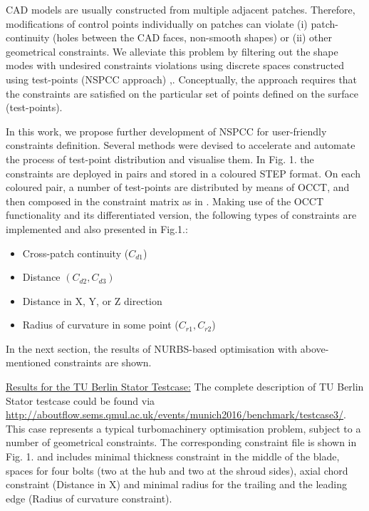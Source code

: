 \documentclass{article}
\begin{document}
CAD models are usually constructed from multiple adjacent patches. Therefore, modifications of control points individually on patches can violate (i) patch-continuity (holes between the CAD faces, non-smooth shapes) or (ii) other geometrical constraints. We alleviate this problem by filtering out the shape modes with undesired constraints violations using discrete spaces constructed using test-points (NSPCC approach) \cite{xu13:cad-based},\cite{xu15cad-based}. Conceptually, the approach requires that the constraints are satisfied on the particular set of points defined on the surface (test-points). 

In this work, we propose further development of NSPCC for user-friendly constraints definition. Several methods were devised to accelerate and automate the process of test-point distribution and visualise them.  In Fig. 1. the constraints are deployed in pairs and stored in a coloured STEP format. On each coloured pair, a number of test-points are distributed by means of OCCT, and then composed in the constraint matrix as in \cite{xu15cad-based}. Making use of the OCCT functionality and its differentiated version, the following types of constraints are implemented and also presented in Fig.1.:
\begin{itemize}
\item Cross-patch continuity ($C_{d1}$)
\item Distance $(C_{d2}, C_{d3})$
\item Distance in X, Y, or Z direction
\item Radius of curvature in some point ($C_{r1}, C_{r2}$)
\end{itemize}
In the next section, the results of NURBS-based optimisation with above-mentioned constraints are shown.


\vspace{10pt}
\noindent\underline{Results for the TU Berlin Stator Testcase:}\vspace{0.2em}\newline
The complete description of TU Berlin Stator testcase could be found via \url{http://aboutflow.sems.qmul.ac.uk/events/munich2016/benchmark/testcase3/}. This case represents a typical turbomachinery optimisation problem, subject to a number of geometrical constraints. The corresponding constraint file is shown in Fig. 1. and includes minimal thickness constraint in the middle of the blade, spaces for four bolts (two at the hub and two at the shroud sides), axial chord constraint (Distance in X) and minimal radius for the trailing and the leading edge (Radius of curvature constraint).
\end{document}
